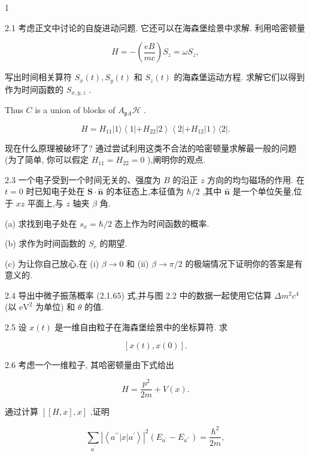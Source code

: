 \documentclass[lang=cn,newtx,10pt,scheme=chinese,thmcnt=section]{elegantbook}
\begin{document}
\begin{problemset}
	\item 1
\end{problemset}

2.1 考虑正文中讨论的自旋进动问题. 它还可以在海森堡绘景中求解. 利用哈密顿量

$$
H = - \left( \frac{eB}{mc}\right) {S}_{z} = \omega {S}_{z},
$$

写出时间相关算符 ${S}_{x}\left( t\right) ,{S}_{y}\left( t\right)$ 和 ${S}_{z}\left( t\right)$ 的海森堡运动方程. 求解它们以得到作为时间函数的 ${S}_{x, y, z}$ .

Thus $C$ is a union of blocks of ${A}_{\mathfrak{p}A}\mathcal{H}$ .

$$
H = {H}_{11}\left| {1\rangle \left\langle {1\left| {+{H}_{22}}\right| 2}\right\rangle \left\langle {2\left| {+{H}_{12}}\right| 1}\right\rangle \langle 2}\right| .
$$

现在什么原理被破坏了? 通过尝试利用这类不合法的哈密顿量求解最一般的问题 (为了简单, 你可以假定 ${H}_{11} = {H}_{22} = 0$ ),阐明你的观点.

2.3 一个电子受到一个时间无关的、强度为 $B$ 的沿正 $z$ 方向的均匀磁场的作用. 在 $t = 0$ 时已知电子处在 $\mathbf{S} \cdot \widehat{\mathbf{n}}$ 的本征态上,本征值为 $\hbar /2$ ,其中 $\widehat{\mathbf{n}}$ 是一个单位矢量,位于 ${xz}$ 平面上,与 $z$ 轴夹 $\beta$ 角.

(a) 求找到电子处在 ${s}_{x} = \hbar /2$ 态上作为时间函数的概率.

(b) 求作为时间函数的 ${S}_{r}$ 的期望.

(c) 为让你自己放心,在 (i) $\beta \rightarrow 0$ 和 (ii) $\beta \rightarrow \pi /2$ 的极端情况下证明你的答案是有意义的.

2.4 导出中微子振荡概率 (2.1.65) 式,并与图 2.2 中的数据一起使用它估算 $\Delta {m}^{2}{c}^{4}$ (以 ${\mathrm{{eV}}}^{2}$ 为单位) 和 $\theta$ 的值.

2.5 设 $x\left( t\right)$ 是一维自由粒子在海森堡绘景中的坐标算符. 求

$$
\left\lbrack {x\left( t\right), x\left( 0\right) }\right\rbrack \text{.}
$$

2.6 考虑一个一维粒子, 其哈密顿量由下式给出

$$
H = \frac{{p}^{2}}{2m} + V\left( x\right) .
$$

通过计算 $\left\lbrack {\left\lbrack {H, x}\right\rbrack, x}\right\rbrack$ ,证明

$$
\mathop{\sum }\limits_{{a}^{\prime }}{\left| \left\langle {a}^{\prime \prime }\left| x\right| {a}^{\prime }\right\rangle \right| }^{2}\left( {{E}_{{a}^{\prime }} - {E}_{{a}^{\prime \prime }}}\right) = \frac{{\hbar }^{2}}{2m},
$$
\end{document}
